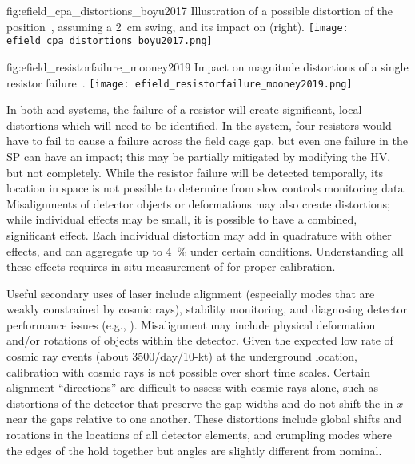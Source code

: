 \begin{dunefigure}{fig:efield_cpa_distortions_boyu2017}
{Illustration of a possible distortion of the  position~\cite{bib:yu2017a}, assuming a \SI{2}{\cm} swing, and its impact on \efield (right).}
\texttt{[image: efield\_cpa\_distortions\_boyu2017.png]}
\end{dunefigure}

\begin{dunefigure}{fig:efield_resistorfailure_mooney2019}
{Impact on \efield magnitude distortions of a single  resistor failure~\cite{bib:mooney2019a}.}
\texttt{[image: efield\_resistorfailure\_mooney2019.png]}
\end{dunefigure}

In both \single and \dual systems, the failure of a resistor will create significant, local \efield distortions which will need to be identified. In the \dual system, four resistors would have to fail to cause a failure across the field cage gap, but even one failure in the SP can have an impact; this may be partially mitigated by modifying the HV, but not completely. While the resistor failure will be detected temporally, its location in space is not possible to determine from slow controls monitoring data. Misalignments of detector objects or deformations may also create  \efield distortions; while individual effects may be small, it is possible to have a combined, significant effect.
Each individual \efield distortion may add in quadrature with other effects, and can aggregate up to \SI{4}{\%} under certain conditions. Understanding all these effects requires in-situ measurement of \efield for proper calibration. 

Useful secondary uses of laser include alignment (especially modes that are weakly constrained by cosmic rays),
stability monitoring, and diagnosing detector performance issues
(e.g., ).  
Misalignment may include physical deformation and/or rotations of objects within the detector. Given the expected low rate of cosmic ray events (about 3500/day/10-kt) at the underground location, calibration with cosmic rays is not possible over short time scales. Certain alignment ``directions''  are difficult to assess with cosmic rays alone, such as distortions of the detector that preserve the gap widths and do not shift the  in $x$ near the gaps relative to one another.
These distortions include global shifts and rotations in the locations of all detector elements, and crumpling modes where the edges of the  hold together but angles are slightly different from nominal.   

